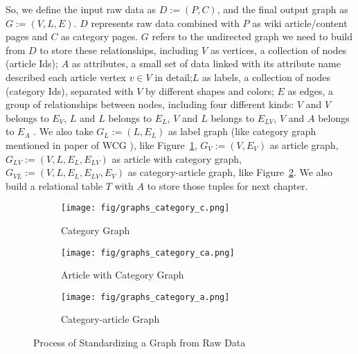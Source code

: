 \indent So, we define the input raw data as $D := (P, C)$, and the final output graph as $G := (V, L, E)$. $D$ represents raw data combined with $P$ as wiki article/content pages and $C$ as category pages. $G$ refers to the undirected graph we need to build from $D$ to store these relationships, including $V$ as vertices, a collection of nodes (article Ids); $A$ as attributes, a small set of data linked with its attribute name described each article vertex $v \in V$ in detail;$L$ as labels, a collection of nodes (category Ids), separated with $V$ by different shapes and colors; $E$ as edges, a group of relationships between nodes, including four different kinds: $V$ and $V$ belongs to $E_V$, $L$ and $L$ belongs to $E_L$, $V$ and $L$ belongs to $E_{LV}$, $V$ and $A$ belongs to $E_A$ \cite{newman2003structure}. We also take $G_L := (L, E_L)$ as label graph (like category graph mentioned in paper of WCG \cite{zesch2007analysis}), like Figure~\ref{fig:section2-pic2}, $G_V := (V, E_V)$ as article graph, $G_{LV} := (V, L, E_L, E_{LV})$ as article with category graph, $G_{VL} := (V, L, E_L, E_{LV}, E_V)$ as category-article graph, like Figure~\ref{fig:section2-pic3}. We also build a relational table $T$ with $A$ to store those tuples for next chapter.

\begin{figure}
	\centering
	\begin{subfigure}{0.31\textwidth}
		\texttt{[image: fig/graphs\_category\_c.png]}
		\caption{Category Graph} 
		\label{fig:section2-pic2}
	\end{subfigure}
	\hspace*{\fill} %
	\begin{subfigure}{0.31\textwidth}
		\texttt{[image: fig/graphs\_category\_ca.png]}
		\caption{Article with Category Graph} \label{fig:section2-pic3}
	\end{subfigure}
	\hspace*{\fill} %
	\begin{subfigure}{0.31\textwidth}
		\texttt{[image: fig/graphs\_category\_a.png]}
		\caption{Category-article Graph} \label{fig:section2-pic4}
	\end{subfigure}
	\caption{Process of Standardizing a Graph from Raw Data} \label{fig:section2-pic234}
	\vspace{-20pt}
\end{figure}

